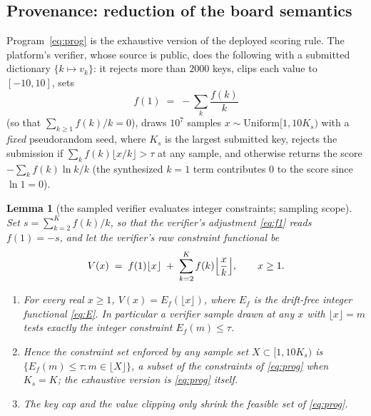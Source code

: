 \documentclass[11pt]{article}
\newtheorem{lemma}[theorem]{Lemma}
\theoremstyle{remark}
\begin{document}
\subsection{Provenance: reduction of the board semantics}
\label{sec:verifier}

Program~\eqref{eq:prog} is the exhaustive version of the deployed scoring
rule. The platform's verifier, whose source is public, does the following
with a submitted dictionary $\{k \mapsto v_k\}$: it rejects more than
$2000$ keys, clips each value to $[-10,10]$, sets
\begin{equation}\label{eq:f1}
f(1) \;=\; -\sum_{k} \frac{f(k)}{k}
\end{equation}
(so that $\sum_{k\ge1} f(k)/k = 0$), draws $10^7$ samples
$x \sim \mathrm{Uniform}[1, 10K_s)$ with a \emph{fixed} pseudorandom seed,
where $K_s$ is the largest submitted key, rejects the submission if
$\sum_k f(k) \lfloor x/k \rfloor > \tau$ at any sample, and otherwise
returns the score $-\sum_k f(k) \ln k / k$ (the synthesized $k=1$ term
contributes $0$ to the score since $\ln 1 = 0$).

\begin{lemma}[the sampled verifier evaluates integer constraints;
sampling scope]\label{lem:verifier}
Set $s = \sum_{k=2}^{K} f(k)/k$, so that the verifier's adjustment
\eqref{eq:f1} reads $f(1) = -s$, and let the verifier's raw constraint
functional be
\[
V(x) \;=\; f(1)\lfloor x\rfloor \;+\; \sum_{k=2}^{K} f(k)
\Bigl\lfloor \frac{x}{k} \Bigr\rfloor , \qquad x \ge 1 .
\]
\begin{enumerate}
\item[(i)] For every real $x \ge 1$, $V(x) = E_f(\lfloor x \rfloor)$, where
$E_f$ is the drift-free integer functional \eqref{eq:E}. In particular a
verifier sample drawn at any $x$ with $\lfloor x \rfloor = m$ tests
\emph{exactly} the integer constraint $E_f(m) \le \tau$.
\item[(ii)] Hence the constraint set enforced by any sample set
$X \subset [1, 10K_s)$ is $\{ E_f(m) \le \tau : m \in \lfloor X \rfloor
\}$, a subset of the constraints of \eqref{eq:prog} when $K_s = K$; the
exhaustive version is \eqref{eq:prog} itself.
\item[(iii)] The key cap and the value clipping only shrink the feasible
set of \eqref{eq:prog}.
\end{enumerate}
\end{lemma}
\end{document}
